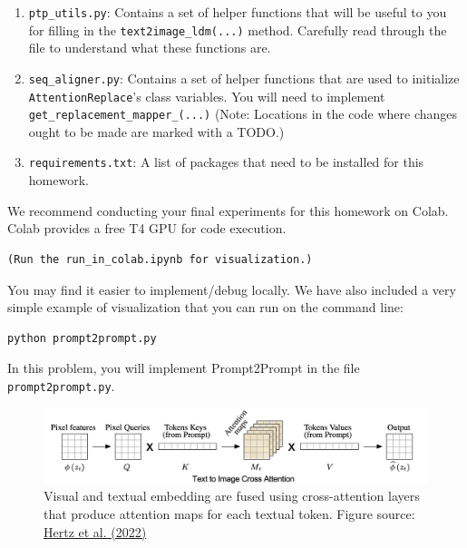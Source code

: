 \documentclass[11pt,addpoints,answers]{exam}
\begin{document}
\begin{questions}
\begin{enumerate}
    \item \lstinline{ptp_utils.py}: Contains a set of helper functions that will be useful to you for filling in the \lstinline{text2image_ldm(...)} method. Carefully read through the file to understand what these functions are.

    \item \lstinline{seq_aligner.py}: Contains a set of helper functions that are used to initialize \lstinline{AttentionReplace}'s class variables. You will need to implement \lstinline{get_replacement_mapper_(...)} (Note: Locations in the code where changes ought to be made are marked with a TODO.)

    \item \lstinline{requirements.txt}: A list of packages that need to be installed for this homework.

\end{enumerate}


We recommend conducting your final experiments for this homework on Colab. Colab provides a free T4 GPU for code execution. 
\begin{lstlisting}
(Run the run_in_colab.ipynb for visualization.)
\end{lstlisting}

You may find it easier to implement/debug locally. We have also included a very simple example of visualization that you can run on the command line:
\begin{lstlisting}
python prompt2prompt.py
\end{lstlisting}



In this problem, you will implement Prompt2Prompt in the file \lstinline{prompt2prompt.py}.

    \begin{figure}[h!]
        \centering
        \includegraphics[width=.9\linewidth]{fig/cross_attention.png}
        \caption{Visual and textual embedding are fused using cross-attention layers that produce attention maps for each textual token. Figure source: \href{https://arxiv.org/pdf/2208.01626.pdf}{Hertz et al. (2022)}}
        \label{fig:crossattention}
    \end{figure}


\end{questions}
\end{document}
